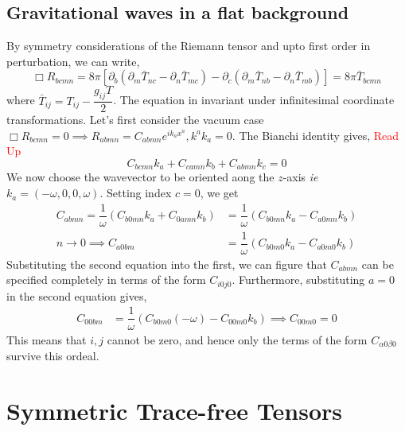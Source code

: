 \documentclass[a4paper,11pt]{article}
\begin{document}
\subsection{Gravitational waves in a flat background}
By symmetry considerations of the Riemann tensor and upto first order in perturbation, we can write,
\begin{equation*}
\Box R_{bcmn } = 8 \pi [\partial_b(\partial_m \bar{T}_{nc} - \partial_n \bar{T}_{mc} ) - \partial_c(\partial_m \bar{T}_{nb} - \partial_n \bar{T}_{mb} )] = 8 \pi \bar{T}_{bcmn}
\end{equation*}
where $ \bar{T}_{ij} = T_{ij} -\dfrac{g_{ij} T}{2} $. The equation in invariant under infinitesimal coordinate transformations. Let's first consider the vacuum case $ \Box R_{bcmn } =0 \implies R_{abmn} = C_{abmn} e^{i k_a x^a}, k^a k_a = 0$. The Bianchi identity gives, \textcolor{red}{Read Up}
\begin{equation*}
C_{bcmn} k_a + C_{camn}k_b + C_{abmn}k_c =0 
\end{equation*}
We now choose the wavevector to be oriented aong the $ z $-axis \textit{ie} $ k_a = (-\omega, 0 , 0 , \omega) $. Setting index $ c=0 $, we get
\begin{align*}
C_{abmn} = \dfrac{1}{\omega}(C_{b0mn} k_a + C_{0amn}k_b ) &= \dfrac{1}{\omega}(C_{b0mn} k_a - C_{a0mn}k_b ) \\
n \rightarrow 0 \implies C_{a0bm} &= \dfrac{1}{\omega}(C_{b0m0} k_a - C_{a0m0}k_b )
\end{align*}
Substituting the second equation into the first, we can figure that $ C_{abmn} $ can be specified completely in terms of the form $ C_{i0j0} $. Furthermore, substituting $a=0$ in the second equation gives,
\begin{align*}
 C_{00bm} &= \dfrac{1}{\omega}(C_{b0m0} (-\omega) - C_{00m0}k_b ) \implies C_{00m0}=0
\end{align*}
This means that $ i,j $ cannot be zero, and hence only the terms of the form $ C_{\alpha 0 \beta 0} $ survive this ordeal.

\section{Symmetric Trace-free Tensors}
\end{document}
